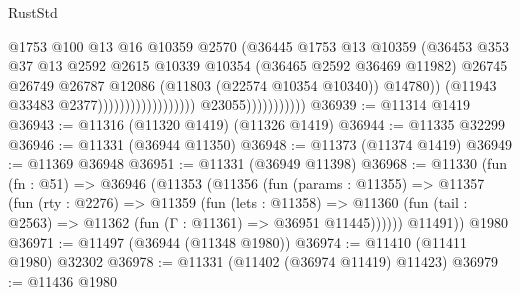 \begin{lexlean}{RustStd}
\begin{coremodule}
                                                            @1753
                                                            @100
                                                            @13
                                                            @16
                                                            @10359
                                                            @2570
                                                            (@36445
                                                              @1753
                                                              @13
                                                              @10359
                                                              (@36453
                                                                @353
                                                                @37
                                                                @13
                                                                @2592
                                                                @2615
                                                                @10339
                                                                @10354
                                                                (@36465 @2592 @36469 @11982)
                                                                @26745
                                                                @26749
                                                                @26787
                                                                @12086
                                                                (@11803 (@22574 @10354 @10340))
                                                                @14780))
                                                            (@11943 @33483 @2377))))))))))))))))))
                          @23055)))))))))))
@36939 := @11314 @1419
@36943 := @11316 (@11320 @1419) (@11326 @1419)
@36944 := @11335 @32299
@36946 := @11331 (@36944 @11350)
@36948 := @11373 (@11374 @1419)
@36949 := @11369 @36948
@36951 := @11331 (@36949 @11398)
@36968 := @11330
    (fun (fn : @51) =>
    @36946
      (@11353
        (@11356
          (fun (params : @11355) =>
          @11357
            (fun (rty : @2276) =>
            @11359
              (fun (lets : @11358) =>
              @11360 (fun (tail : @2563) => @11362 (fun (Γ : @11361) => @36951 @11445))))))
        @11491))
    @1980
@36971 := @11497 (@36944 (@11348 @1980))
@36974 := @11410 (@11411 @1980) @32302
@36978 := @11331 (@11402 (@36974 @11419) @11423)
@36979 := @11436 @1980

\end{coremodule}
\end{lexlean}
